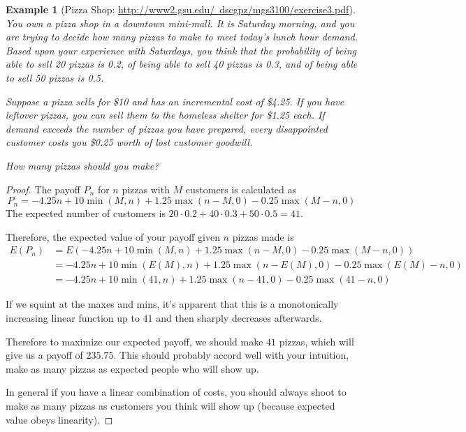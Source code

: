 \documentclass{article}
\newtheorem{example}{Example}
\begin{document}
\begin{example}[Pizza Shop: \href{http://www2.gsu.edu/~dscgpz/mgs3100/exercise3.pdf}{http://www2.gsu.edu/~dscgpz/mgs3100/exercise3.pdf}]
You own a pizza shop in a downtown mini-mall. It is Saturday morning, and you
are trying to decide how many pizzas to make to meet today's lunch
hour demand. Based upon your experience with Saturdays, you think
that the probability of being able to sell 20 pizzas is 0.2, of
being able to sell 40 pizzas is 0.3, and of being able to sell 50 pizzas is
0.5.

Suppose a pizza sells for \$10 and has an incremental cost of
\$4.25. If you have leftover pizzas, you can sell them to the
homeless shelter for \$1.25 each. If demand exceeds the number of
pizzas you have prepared, every disappointed customer costs you \$0.25 worth of
lost customer goodwill. 

How many pizzas should you make?
\end{example}
\begin{proof}
	The payoff $P_n$ for $n$ pizzas with $M$ customers is calculated as
	\begin{equation}
		P_n = -4.25 n + 10 \min(M, n) + 1.25 \max(n - M, 0) - 0.25 \max(M - n, 0)
	\end{equation}
	The expected number of customers is $20 \cdot 0.2 + 40 \cdot 0.3 + 50 \cdot 0.5 = 41$.

	Therefore, the expected value of your payoff given $n$ pizzas made is
	\begin{align*}
		E(P_n) 
		&= E(-4.25 n + 10 \min(M, n) + 1.25 \max(n - M, 0) - 0.25 \max(M - n, 0))\\
		&= -4.25n + 10 \min(E(M), n) + 1.25 \max(n - E(M), 0) - 0.25 \max (E(M) - n, 0)\\
		&= -4.25n + 10 \min(41, n) + 1.25 \max (n - 41, 0) - 0.25 \max (41 - n, 0)
	\end{align*}

	If we squint at the maxes and mins, it's apparent that this is a monotonically increasing linear function up to $41$ and then sharply decreases afterwards.

	Therefore to maximize our expected payoff, we should make $41$ pizzas, which will give us a payoff of $235.75$.
	This should probably accord well with your intuition, make as many pizzas as expected people who will show up.

	In general if you have a linear combination of costs, you should always shoot to make as many pizzas as customers you think will show up (because expected value obeys linearity).
\end{proof}
\end{document}

